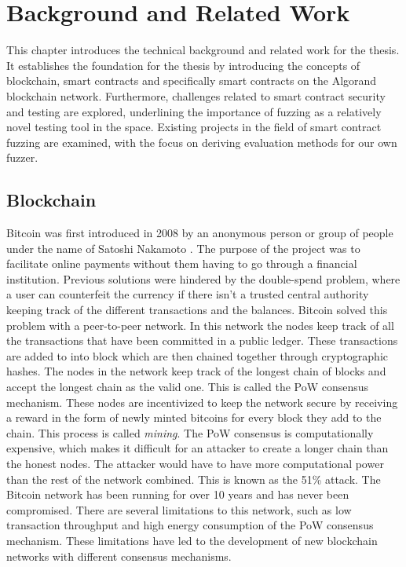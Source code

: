 
\chapter{Background and Related Work}\label{chapter:background}
This chapter introduces the technical background and related work for the thesis. It establishes the foundation for the thesis by introducing the concepts of blockchain, smart contracts and specifically smart contracts on the Algorand blockchain network. Furthermore, challenges related to smart contract security and testing are explored, underlining the importance of fuzzing as a relatively novel testing tool in the space. Existing projects in the field of smart contract fuzzing are examined, with the focus on deriving evaluation methods for our own fuzzer.

\section{Blockchain}
Bitcoin was first introduced in 2008 by an anonymous person or group of people under the name of Satoshi Nakamoto \cite{nakamoto_bitcoin_2008}. The purpose of the project was to facilitate online payments without them having to go through a financial institution. Previous solutions were hindered by the double-spend problem, where a user can counterfeit the currency if there isn't a trusted central authority keeping track of the different transactions and the balances. Bitcoin solved this problem with a peer-to-peer network. In this network the nodes keep track of all the transactions that have been committed in a public ledger. These transactions are added to into block which are then chained together through cryptographic hashes. The nodes in the network keep track of the longest chain of blocks and accept the longest chain as the valid one. This is called the \ac{PoW} consensus mechanism. These nodes are incentivized to keep the network secure by receiving a reward in the form of newly minted bitcoins for every block they add to the chain. This process is called \textit{mining}. The \ac{PoW} consensus is computationally expensive, which makes it difficult for an attacker to create a longer chain than the honest nodes. The attacker would have to have more computational power than the rest of the network combined.
This is known as the 51\% attack. The Bitcoin network has been running for over 10 years and has never been compromised.
There are several limitations to this network, such as low transaction throughput and high energy consumption of the \ac{PoW} consensus mechanism.
These limitations have led to the development of new blockchain networks with different consensus mechanisms.

